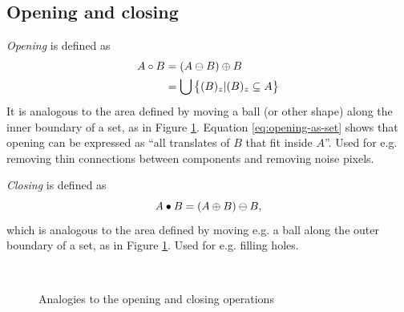 \subsection{Opening and closing}\label{ssec:open-close}
\emph{Opening} is defined as
\begin{subequations}
\begin{align}
    A \circ B &= (A \ominus B) \oplus B \\
              &= \bigcup \left\{ (B)_z | (B)_z \subseteq A \right\} \label{eq:opening-as-set}
\end{align}
\end{subequations}
It is analogous to the area defined by moving a ball (or other shape) along the inner boundary of a set, as in Figure \ref{fig:openclose}. Equation \eqref{eq:opening-as-set} shows that opening can be expressed as ``all translates of $B$ that fit inside $A$''. Used for e.g. removing thin connections between components and removing noise pixels.

\emph{Closing} is defined as
\begin{equation}
    A \bullet B = (A \oplus B) \ominus B,
\end{equation}
which is analogous to the area defined by moving e.g. a ball along the outer boundary of a set, as in Figure \ref{fig:openclose}. Used for e.g. filling holes.

\begin{figure}[htbp]
    \centering
     \\
    \caption{Analogies to the opening and closing operations}
    \label{fig:openclose}
\end{figure}

